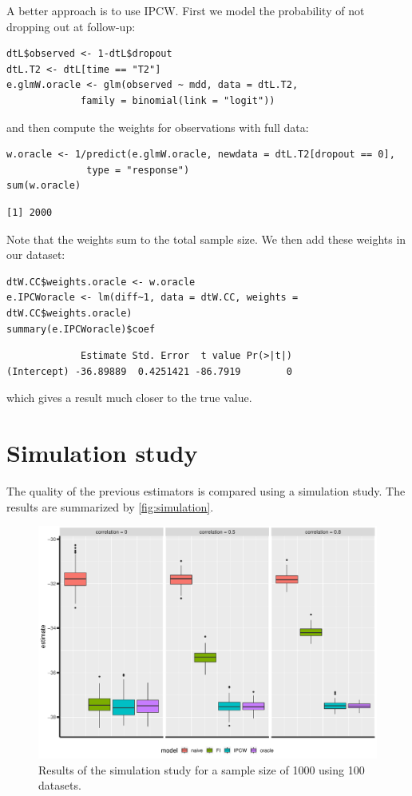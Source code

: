 \documentclass[12pt]{article}
\begin{document}
\clearpage

 A better approach is to use IPCW. First we model the probability of
not dropping out at follow-up:
\lstset{language=r,label= ,caption= ,captionpos=b,numbers=none}
\begin{lstlisting}
dtL$observed <- 1-dtL$dropout
dtL.T2 <- dtL[time == "T2"]
e.glmW.oracle <- glm(observed ~ mdd, data = dtL.T2,
		     family = binomial(link = "logit"))
\end{lstlisting}

and then compute the weights for observations with full data:

\lstset{language=r,label= ,caption= ,captionpos=b,numbers=none}
\begin{lstlisting}
w.oracle <- 1/predict(e.glmW.oracle, newdata = dtL.T2[dropout == 0],
		      type = "response")
sum(w.oracle)
\end{lstlisting}

\begin{verbatim}
[1] 2000
\end{verbatim}


Note that the weights sum to the total sample size. We then add these
weights in our dataset:
\lstset{language=r,label= ,caption= ,captionpos=b,numbers=none}
\begin{lstlisting}
dtW.CC$weights.oracle <- w.oracle
e.IPCWoracle <- lm(diff~1, data = dtW.CC, weights = dtW.CC$weights.oracle)
summary(e.IPCWoracle)$coef
\end{lstlisting}

\begin{verbatim}
             Estimate Std. Error  t value Pr(>|t|)
(Intercept) -36.89889  0.4251421 -86.7919        0
\end{verbatim}


which gives a result much closer to the true value.

\section{Simulation study}
\label{sec:org7c5604a}

The quality of the previous estimators is compared using a simulation
study. The results are summarized by \autoref{fig:simulation}.

\begin{figure}[!h]
\centering
\includegraphics[width=\textwidth]{./figures/simStudy-bias.pdf}
\caption{\label{fig:simulation}Results of the simulation study for a sample size of 1000 using 100 datasets.}
\end{figure}
\end{document}
